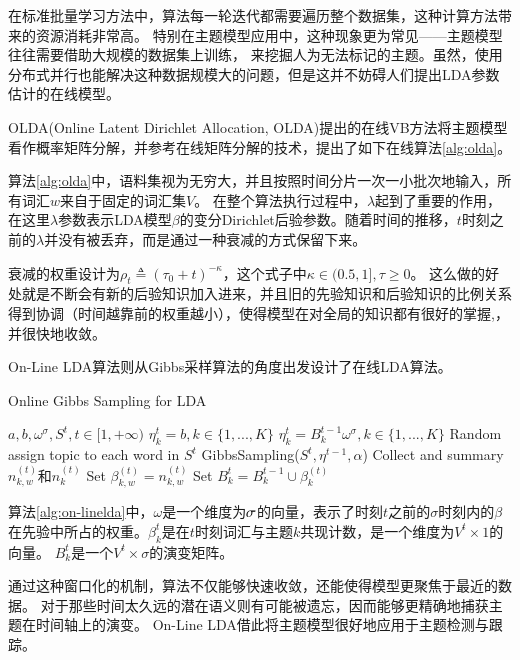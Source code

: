 在标准批量学习方法中，算法每一轮迭代都需要遍历整个数据集，这种计算方法带来的资源消耗非常高。
特别在主题模型应用中，这种现象更为常见——主题模型往往需要借助大规模的数据集上训练，
来挖掘人为无法标记的主题。虽然，使用分布式并行也能解决这种数据规模大的问题，但是这并不妨碍人们提出LDA参数估计的在线模型。

OLDA(Online Latent Dirichlet Allocation, OLDA)\cite{hoffman2010online}提出的在线VB方法将主题模型看作概率矩阵分解，并参考在线矩阵分解的技术\cite{mairal2010online}，提出了如下在线算法\ref{alg:olda}。

算法\ref{alg:olda}中，语料集视为无穷大，并且按照时间分片一次一小批次地输入，所有词汇$w$来自于固定的词汇集$V$。
在整个算法执行过程中，$\lambda$起到了重要的作用，在这里$\lambda$参数表示LDA模型$\beta$的变分Dirichlet后验参数。随着时间的推移，$t$时刻之前的$\lambda$并没有被丢弃，而是通过一种衰减的方式保留下来。

衰减的权重设计为$\rho_t \triangleq (\tau_0 + t ) ^{-\kappa}$，这个式子中$\kappa \in (0.5, 1], \tau \ge 0$。
这么做的好处就是不断会有新的后验知识加入进来，并且旧的先验知识和后验知识的比例关系得到协调（时间越靠前的权重越小），使得模型在对全局的知识都有很好的掌握,，并很快地收敛。

On-Line LDA\cite{alsumait2008on-line}算法则从Gibbs采样算法的角度出发设计了在线LDA算法。

\begin{algorithm}[htb]
\caption{Online Gibbs Sampling for LDA} 
\label{alg:on-linelda}
\begin{algorithmic}[1]
\Require $ a, b, \omega^{\sigma}, S^t, t \in [1, +\infty)$
\State $\eta_k^t = b, k \in \{1, ..., K\}$
\Else
\State $\eta_k^t = B_k^{t-1} \omega^{\sigma}, k \in \{1, ..., K\}$
\EndIf
\State Random assign topic to each word in $S^t$
\State GibbsSampling($S^t, \eta^{t - 1}, \alpha$)
\EndFor
\State Collect and summary $n_{k,w}^{(t)}$和$n_{k}^{(t)}$
\State Set $\beta_{k,w}^{(t)} = n_{k,w}^{(t)}$
\State Set $B_k^t = B_k^{t - 1} \cup \beta_k^{(t)}$
\EndFor
\end{algorithmic}  
\end{algorithm}  

算法\ref{alg:on-linelda}中，$\omega$是一个维度为$\sigma \time 1 $的向量，表示了时刻$t$之前的$\sigma$时刻内的$\beta$在先验中所占的权重。$\beta_k^t$是在$t$时刻词汇与主题$k$共现计数，是一个维度为$V^t \times 1$的向量。
$B_k^t$是一个$V^t \times \sigma$的演变矩阵。

通过这种窗口化的机制，算法不仅能够快速收敛，还能使得模型更聚焦于最近的数据。
对于那些时间太久远的潜在语义则有可能被遗忘，因而能够更精确地捕获主题在时间轴上的演变。
On-Line LDA借此将主题模型很好地应用于主题检测与跟踪。

